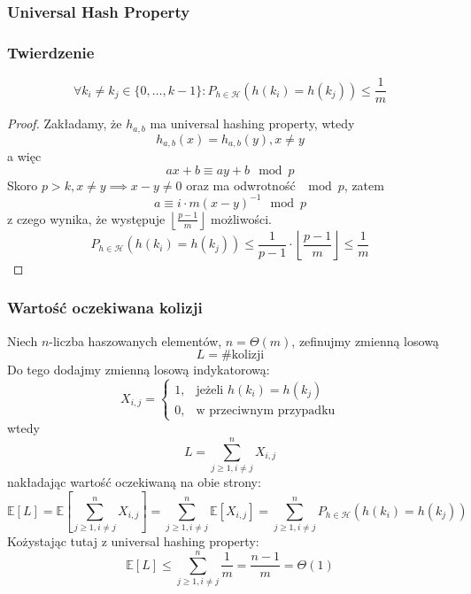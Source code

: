 \documentclass[11pt,a4paper]{article}
\begin{document}
\subsubsection{Universal Hash Property}
\subsubsection*{Twierdzenie}
\[
    \forall k_i \neq k_j \in \{0,\dots, k-1\}:P_{h\in\mathcal{H}}\left(h(k_i) = h(k_j)\right) \leq \frac{1}{m}
\]
\begin{proof}
    Zakładamy, że $h_{a,b}$ ma universal hashing property, wtedy
    \[
        h_{a,b}(x) = h_{a,b}(y), x \neq y
    \]
    a więc
    \[
        ax + b \equiv ay + b \mod p
    \]
    Skoro $p > k, x \neq y \implies x-y\neq 0$ oraz ma odwrotność $\mod p$, zatem
    \[
        a \equiv i\cdot m (x-y)^{-1} \mod p
    \]
    z czego wynika, że występuje $\left\lfloor \frac{p-1}{m}\right\rfloor$ możliwości.
    \[
        P_{h\in\mathcal{H}}\left(h(k_i) = h(k_j)\right) \leq \frac{1}{p-1} \cdot \left\lfloor \frac{p-1}{m}\right\rfloor \leq \frac{1}{m}
    \]
\end{proof}

\subsubsection{Wartość oczekiwana kolizji}
Niech $n$-liczba haszowanych elementów, $n=\Theta(m)$, zefinujmy zmienną losową
\[
    L = \text{\#kolizji}
\]
Do tego dodajmy zmienną losową indykatorową:
\[
    X_{i,j} = \begin{cases}
        1, & \text{jeżeli } h(k_i) = h(k_j) \\
        0, & \text{w przeciwnym przypadku}
    \end{cases}
\]
wtedy
\[
    L=\sum_{j\geq 1, i \neq j}^{n} X_{i,j}
\]
nakładając wartość oczekiwaną na obie strony:
\[
    \mathbb{E}[L] = \mathbb{E}\left[\sum_{j\geq 1, i \neq j}^{n} X_{i,j}\right] = \sum_{j\geq 1, i \neq j}^{n} \mathbb{E}[X_{i,j}]= \sum_{j\geq 1, i \neq j}^{n} P_{h\in\mathcal{H}}\left(h(k_i) = h(k_j)\right)
\]
Kożystając tutaj z universal hashing property:
\[
    \mathbb{E}[L] \leq \sum_{j\geq 1, i \neq j}^{n} \frac{1}{m} = \frac{n-1}{m} = \Theta(1)
\]
\end{document}
